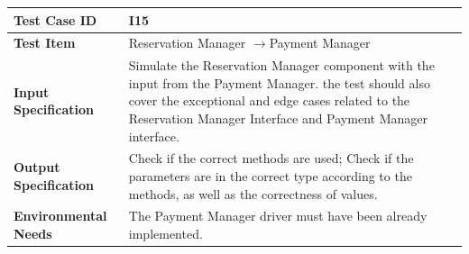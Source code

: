 \documentclass[a4paper,11pt]{article}
\begin{document}
\begin{table}[H] 
\begin{center}
\renewcommand\arraystretch{1.5}
\begin{tabular}{|p{5cm}|p{7cm}|}
 \hline
\textbf{Test Case ID}& I15\\
 \hline
\textbf{Test Item}&Reservation Manager $\rightarrow$Payment Manager\\
 \hline
\textbf{Input Specification}&Simulate the Reservation Manager component with the input from the Payment Manager. the test should also cover the exceptional and edge cases related to the Reservation Manager Interface and Payment Manager interface.\\
 \hline
\textbf{Output Specification}&Check if the correct methods are used;
Check if the parameters are in the correct type according to the methods, as well as the correctness of values.\\
 \hline
 \textbf{Environmental Needs}&The Payment Manager driver must have been already implemented.\\
 \hline
\end{tabular}
\end{center}
\end{table}		
\end{document}
